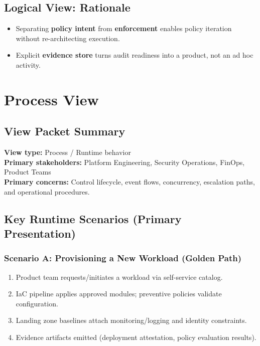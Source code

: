 \documentclass[11pt]{report}
\begin{document}
\section{Logical View: Rationale}
\begin{itemize}
  \item Separating \textbf{policy intent} from \textbf{enforcement} enables policy iteration without re-architecting execution.
  \item Explicit \textbf{evidence store} turns audit readiness into a product, not an ad hoc activity.
\end{itemize}

\clearpage

\chapter{Process View}
\section{View Packet Summary}
\begin{viewbox}
\textbf{View type:} Process / Runtime behavior\\
\textbf{Primary stakeholders:} Platform Engineering, Security Operations, FinOps, Product Teams\\
\textbf{Primary concerns:} Control lifecycle, event flows, concurrency, escalation paths, and operational procedures.
\end{viewbox}

\section{Key Runtime Scenarios (Primary Presentation)}
\subsection{Scenario A: Provisioning a New Workload (Golden Path)}
\begin{enumerate}
  \item Product team requests/initiates a workload via self-service catalog.
  \item IaC pipeline applies approved modules; preventive policies validate configuration.
  \item Landing zone baselines attach monitoring/logging and identity constraints.
  \item Evidence artifacts emitted (deployment attestation, policy evaluation results).
\end{enumerate}
\end{document}
